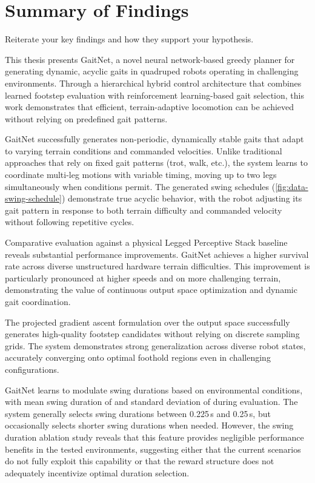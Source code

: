 \section{Summary of Findings}
\label{sec:conclusions-summary-of-findings}

\begin{outline}
  Reiterate your key findings and how they support your hypothesis.
\end{outline}

This thesis presents GaitNet, a novel neural network-based greedy
planner for generating dynamic, acyclic gaits in quadruped robots
operating in challenging environments. Through a hierarchical hybrid
control architecture that combines learned footstep evaluation with
reinforcement learning-based gait selection, this work demonstrates
that efficient, terrain-adaptive locomotion can be achieved without
relying on predefined gait patterns.

GaitNet successfully generates non-periodic, dynamically stable gaits
that adapt to varying terrain conditions and commanded velocities.
Unlike traditional approaches that rely on fixed gait patterns (trot,
walk, etc.), the system learns to coordinate multi-leg motions with
variable timing, moving up to two legs simultaneously when conditions
permit. The generated swing schedules
(\autoref{fig:data-swing-schedule}) demonstrate true acyclic
behavior, with the robot adjusting its gait pattern in response to
both terrain difficulty and commanded velocity without following
repetitive cycles.

Comparative evaluation against a physical Legged Perceptive Stack baseline
reveals substantial performance improvements. GaitNet achieves a higher
survival rate across diverse unstructured hardware terrain
difficulties. This improvement
is particularly pronounced at higher speeds and on more challenging
terrain, demonstrating the value of continuous output space optimization
and dynamic gait coordination.

The projected gradient ascent formulation over the output space
successfully generates high-quality footstep candidates without relying
on discrete sampling grids. The system demonstrates strong generalization
across diverse robot states, accurately converging onto optimal foothold regions
even in challenging configurations.

GaitNet learns to modulate swing durations based on environmental
conditions, with mean swing duration of
\resGaitNetMeanSwingDuration{} and standard deviation of
\resGaitNetSTDSwingDuration{} during evaluation. The system generally
selects swing durations between 0.225\,s and 0.25\,s, but
occasionally selects shorter swing durations when needed. However,
the swing duration ablation study reveals that this feature provides
negligible performance benefits in the tested environments, suggesting
either that the current
scenarios do not fully exploit this capability or that the reward
structure does not adequately incentivize optimal duration selection.

